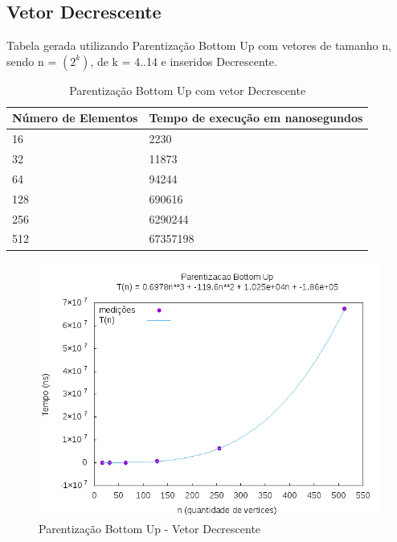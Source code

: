 \documentclass[12pt,a4paper,twoside]{report}
\begin{document}
\subsection{Vetor Decrescente}
Tabela gerada utilizando Parentização Bottom Up com vetores de tamanho n, sendo n = $(2^k)$, de k = 4..14 e inseridos Decrescente.
\begin{table}[H]
\centering
\caption{Parentização Bottom Up com vetor Decrescente}
\label{my-label}
\begin{tabular}{|l|l|}
\hline
\multicolumn{1}{|c|}{\textbf{Número de Elementos}} & \multicolumn{1}{c|}{\textbf{Tempo de execução em nanosegundos}} \\ \hline
16 & 2230 \\ \hline
32 & 11873 \\ \hline
64 & 94244 \\ \hline
128 & 690616 \\ \hline
256 & 6290244 \\ \hline
512 & 67357198 \\ \hline
\end{tabular}
\end{table}

\begin{figure}[H]
    \centering
    \includegraphics[width=0.7\linewidth]{graficos/Parentizacao BottomUp/Decrescente/ParentizacaoBottomUp.png}
  \caption{Parentização Bottom Up - Vetor Decrescente}
\end{figure}
\end{document}
